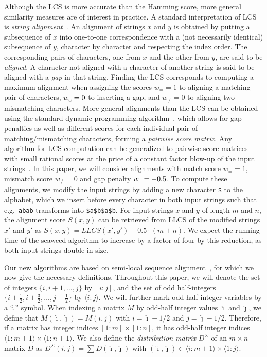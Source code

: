 \documentclass{IOS-Book-Article}     \usepackage{amsmath}
\theoremstyle{plain}
\theoremstyle{definition}
\begin{document}
Although the LCS is more accurate than the Hamming score, 
more general similarity measures are of interest in practice. A standard
interpretation of LCS is \textit{string alignment}~\cite[p. 209 ff.]{Gusfield:97}. 
An alignment of strings $x$ and $y$ is obtained by putting a subsequence of $x$
into one-to-one correspondence with a (not necessarily identical) subsequence
of $y$, character by character and respecting the index order. The
corresponding pairs of characters, one from $x$ and the other from $y$, are
said to be \textit{aligned}. A character not aligned with a character of
another string is said to be aligned with a \textit{gap} in that string.
Finding the LCS corresponds to computing a maximum alignment when assigning the scores
 $w_{=} = 1$ to aligning a matching pair of characters, $w_{\text{\textvisiblespace}} = 0$ to
inserting a gap, and $w_{\neq} = 0$ to aligning two mismatching characters.
More general alignments than the LCS can be obtained using the standard dynamic
programming algorithm~\cite{Wagner+:74,Needleman1}, which allows for gap
penalties as well as different scores for each individual pair of matching/mismatching characters,
forming a \textit{pairwise score matrix}. Any algorithm for LCS computation can
be generalized to pairwise score matrices with small rational scores at the
price of a constant factor blow-up of the input
strings~\cite{TiskinL:07:Applications}. In this paper, we will consider
alignments with match score $w_{=} = 1$, mismatch score $w_{\neq} = 0$ and gap penalty
$w_{\text{\textvisiblespace}} = -0.5$.
To compute these alignments, we modify the input strings by adding a new character
\texttt{\$} to the alphabet, which we insert before every character in both
input strings such that e.g.\ \texttt{abab} transforms into \texttt{\$a\$b\$a\$b}. 
For input strings $x$ and $y$ of length $m$ and $n$, the alignment score
 $S(x,y)$ can be retrieved from LLCS of the modified strings $x'$ and $y'$ as
 $S(x,y) = LLCS(x',y') - 0.5 \cdot (m + n)$.
We expect the running time of the seaweed
algorithm to increase by a factor of four by this reduction, as both input
strings double in size.

Our new algorithms are based on semi-local sequence alignment~\cite{Tiskin:05},
for which we now give the necessary definitions. Throughout this paper, we will
denote the set of integers $\{i, i+1, \ldots, j\}$ by $[i : j]$, and the set of odd half-integers
$\{i+\frac{1}{2}, i+\frac{3}{2}, \ldots, j - \frac{1}{2}\}$ by $\langle i : j
\rangle$. We will further mark odd half-integer variables by a ``$\hat{\ }$''
symbol. When indexing a matrix $M$ by odd-half integer values $\hat{\imath}$
and $\hat{\jmath}$, we define that $M(\hat{\imath}, \hat{\jmath}) = M(i, j)$
with $i = \hat{\imath}-1/2$ and $j = \hat{\jmath} - 1/2$. Therefore, if a
matrix has integer indices $[1:m]\times [1:n]$, it has odd-half integer
indices $\langle 1:m+1\rangle\times \langle 1:n+1\rangle$. 
We also define the \textit{distribution matrix} $D^\Sigma$ of an $m\times n$
matrix $D$ as $ D^\Sigma(i,j) = \sum
D(\hat{\imath},\hat{\jmath})$ with $(\hat{\imath},\hat{\jmath})\in
\langle i:m+1 \rangle \times \langle 1:j \rangle
\text{.}$
\end{document}
